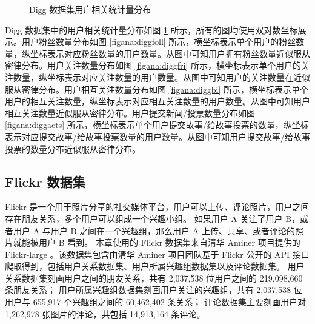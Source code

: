 \begin{figure}
	\centering

    \caption{Digg 数据集用户相关统计量分布}
    \label{figana:digg}
\end{figure}

Digg 数据集中的用户相关统计量分布如图 \ref{figana:digg} 所示，所有的图均使用双对数坐标展示。用户粉丝数量分布如图 \ref{figana:diggfoll} 所示，横坐标表示单个用户的粉丝数量，纵坐标表示对应粉丝数量的用户数量。从图中可知用户拥有粉丝数量近似服从密律分布。用户关注数量分布如图 \ref{figana:diggfri} 所示，横坐标表示单个用户的关注数量，纵坐标表示对应关注数量的用户数量。从图中可知用户的关注数量在近似服从密律分布。用户相互关注数量分布如图 \ref{figana:diggbi} 所示，横坐标表示单个用户的相互关注数量，纵坐标表示对应相互关注数量的用户数量。从图中可知用户相互关注数量近似服从密律分布。用户提交新闻/投票数量分布如图 \ref{figana:diggacts} 所示，横坐标表示单个用户提交故事/给故事投票的数量，纵坐标表示对应提交故事/给故事投票数量的用户数量。从图中可知用户提交故事/给故事投票的数量分布近似服从密律分布。



\subsection{Flickr 数据集}
Flickr 是一个用于照片分享的社交媒体平台，用户可以上传、评论照片，用户之间存在朋友关系，多个用户可以组成一个兴趣小组。
如果用户 A 关注了用户 B，或者用户 A 与用户 B 之间在一个兴趣组，那么用户 A 上传、共享、或者评论的照片就能被用户 B 看到。
本章使用的 Flickr 数据集来自清华 Aminer 项目提供的 Flickr-large \cite{flickrdata}。该数据集包含由清华 Aminer 项目团队基于 Flickr 公开的 API 接口爬取得到，包括用户关系数据集、用户所属兴趣组数据集以及评论数据集。
用户关系数据集刻画用户之间的朋友关系，共有 2,037,538 位用户之间的 219,098,660 条朋友关系；
用户所属兴趣组数据集刻画用户关注的兴趣组，共有 2,037,538 位用户与 655,917 个兴趣组之间的 60,462,402 条关系；
评论数据集主要刻画用户对 1,262,978 张图片的评论，共包括 14,913,164 条评论。



